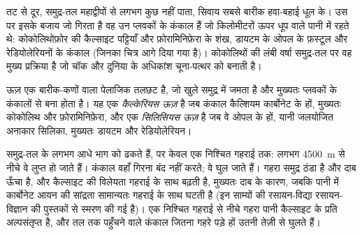 तट से दूर, समुद्र-तल महाद्वीपों से लगभग कुछ नहीं पाता, सिवाय सबसे बारीक हवा-बहाई धूल के। उस पर इसके बजाय जो गिरता है वह उन प्लवकों के कंकाल हैं जो किलोमीटरों ऊपर धूप वाले पानी में रहते थे: कोकोलिथोफ़ोर की कैल्साइट पट्टियाँ और फ़ोरामिनिफ़ेरा के शंख, डायटम के ओपल के फ़स्टूल और रेडियोलेरियनों के कंकाल (जिनका चित्र आगे दिया गया है)। कोकोलिथों की लंबी वर्षा समुद्र-तल पर वह मुख्य प्रक्रिया है जो चॉक और दुनिया के अधिकांश चूना-पत्थर को बनाती है।

\begin{definition}[कैल्केरियस ऊज़, सिलिसियस ऊज़]\label{def:b1:chemical-biogenic-sediments:ooze}
ऊज़ एक बारीक-कणों वाला पेलाजिक तलछट है, जो खुले समुद्र में जमता है और मुख्यतः प्लवकों के कंकालों से बना होता है। यह एक \emph{कैल्केरियस ऊज़} है जब कंकाल कैल्शियम कार्बोनेट के हों, मुख्यतः कोकोलिथ और फ़ोरामिनिफ़ेरा, और एक \emph{सिलिसियस ऊज़} है जब वे ओपल के हों, यानी जलयोजित अनाकार सिलिका, मुख्यतः डायटम और रेडियोलेरियन।
\end{definition}

 समुद्र-तल के लगभग आधे भाग को ढकते हैं, पर केवल एक निश्चित गहराई तक: लगभग \qty{4500}{m} से नीचे वे लुप्त हो जाते हैं। कंकाल वहाँ गिरना बंद नहीं करते; वे घुल जाते हैं। गहरा समुद्र ठंडा है और दाब ऊँचा है, और कैल्साइट की विलेयता गहराई के साथ बढ़ती है, मुख्यतः दाब के कारण, जबकि पानी में कार्बोनेट आयन की सांद्रता सामान्यतः गहराई के साथ घटती है (इन साम्यों की रसायन-विद्या रसायन-विज्ञान की पुस्तकों से स्मरण की गई है)। एक निश्चित गहराई से नीचे गहरा पानी कैल्साइट के प्रति अल्पसंतृप्त है, और तल तक पहुँचने वाले कंकाल जितना गहरे पड़े हों उतनी तेज़ी से घुलते हैं।


